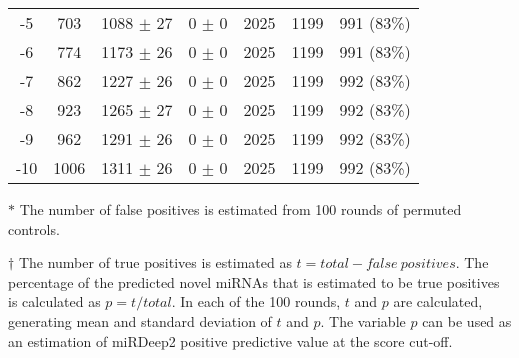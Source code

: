 \begin{table}[!htbp]
\begin{threeparttable}
\begin{tabular}{ccccccc}
    -5    & 703   & 1088 $\pm$ 27 & 0 $\pm$ 0 & 2025  & 1199  & 991 (83\%) \\
    -6    & 774   & 1173 $\pm$ 26 & 0 $\pm$ 0 & 2025  & 1199  & 991 (83\%) \\
    -7    & 862   & 1227 $\pm$ 26 & 0 $\pm$ 0 & 2025  & 1199  & 992 (83\%) \\
    -8    & 923   & 1265 $\pm$ 27 & 0 $\pm$ 0 & 2025  & 1199  & 992 (83\%) \\
    -9    & 962   & 1291 $\pm$ 26 & 0 $\pm$ 0 & 2025  & 1199  & 992 (83\%) \\
    -10   & 1006  & 1311 $\pm$ 26 & 0 $\pm$ 0 & 2025  & 1199  & 992 (83\%) \\
		\bottomrule
	\end{tabular}
	\begin{tablenotes}
		\item[$\ast$] The number of false positives is estimated from 100 rounds of permuted controls.
		\item[$\dagger$] The number of true positives is estimated as $t = \mathit{total} - \mathit{false\:positives}$. The percentage of the predicted novel miRNAs that is estimated to be true positives is calculated as $p = t / \mathit{total}$. In each of the 100 rounds, $t$ and $p$ are calculated, generating mean and standard deviation of $t$ and $p$. The variable $p$ can be used as an estimation of miRDeep2 positive predictive value at the score cut-off. 
    \end{tablenotes}
\end{threeparttable}
\end{table}